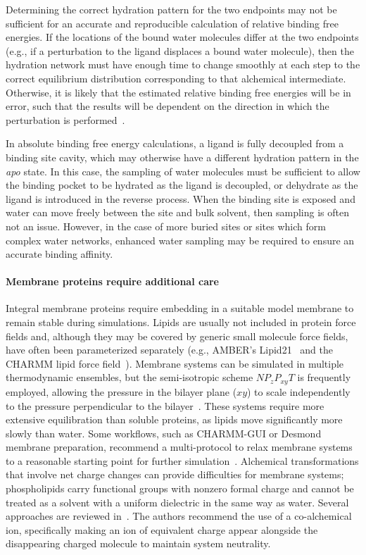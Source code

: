\documentclass[9pt,bestpractices]{livecoms}
\begin{document}
Determining the correct hydration pattern for the two endpoints may not be sufficient for an accurate and reproducible calculation of relative binding free energies. If the locations of the bound water molecules differ at the two endpoints (e.g., if a perturbation to the ligand displaces a bound water molecule), then the hydration network must have enough time to change smoothly at each step to the correct equilibrium distribution corresponding to that alchemical intermediate.  Otherwise, it is likely that the estimated relative binding free energies will be in error, such that the results will be dependent on the direction in which the perturbation is performed~\cite{ross2020enhancing}.

In absolute binding free energy calculations, a ligand is fully decoupled from a binding site cavity, which may otherwise have a different hydration pattern in the \textit{apo} state. In this case, the sampling of water molecules must be sufficient to allow the binding pocket to be hydrated as the ligand is decoupled, or dehydrate as the ligand is introduced in the reverse process. When the binding site is exposed and water can move freely between the site and bulk solvent, then sampling is often not an issue. However, in the case of more buried sites or sites which form complex water networks, enhanced water sampling may be required to ensure an accurate binding affinity.

\paragraph{Membrane proteins require additional care}
Integral membrane proteins require embedding in a suitable model membrane to remain stable during simulations. Lipids are usually not included in protein force fields and, although they may be covered by generic small molecule force fields, have often been parameterized separately (e.g., AMBER's Lipid21~\cite{AMBERLipid21} and the CHARMM lipid force field~\cite{CHARMMLipidFF}). Membrane systems can be simulated in multiple thermodynamic ensembles, but the semi-isotropic scheme $NP_{z}P_{xy}T$ is frequently employed, allowing the pressure in the bilayer plane ($xy$) to scale independently to the pressure perpendicular to the bilayer~\cite{LipidBestPracticesCOMS}. These systems require more extensive equilibration than soluble proteins, as lipids move significantly more slowly than water. Some workflows, such as CHARMM-GUI or Desmond membrane preparation, recommend a multi-protocol to relax membrane systems to a reasonable starting point for further simulation~\cite{https://doi.org/10.1002/jcc.23702,DesmondManual}.  Alchemical transformations that involve net charge changes can provide difficulties for membrane systems; phospholipids carry functional groups with nonzero formal charge and cannot be treated as a solvent with a uniform dielectric in the same way as water. Several approaches are reviewed in~\cite{wu2022correction-51c}. The authors recommend the use of a co-alchemical ion, specifically making an ion of equivalent charge appear alongside the disappearing charged molecule to maintain system neutrality.
\end{document}
